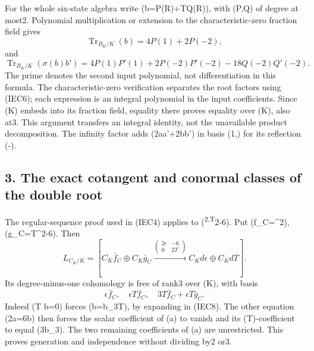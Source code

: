 \documentclass[
]{article}
\begin{document}
For the whole six-state algebra write (b=P(R)+TQ(R)), with (P,Q) of
degree at most2. Polynomial multiplication or extension to the
characteristic-zero fraction field gives \[
\operatorname{Tr}_{B_K/K}(b)=4P(1)+2P(-2),
\tag{IEC14}
\] and \[
\operatorname{Tr}_{B_K/K}(\sigma(b)b')
=4P(1)P'(1)+2P(-2)P'(-2)-18Q(-2)Q'(-2).
\tag{IEC15}
\] The prime denotes the second input polynomial, not differentiation in
this formula. The characteristic-zero verification separates the root
factors using (IEC6); each expression is an integral polynomial in the
input coefficients. Since (K) embeds into its fraction field, equality
there proves equality over (K), also at3. This argument transfers an
integral identity, not the unavailable product decomposition. The
infinity factor adds (2aa'+2bb') in basis (1,\Theta) for its reflection
(\Theta\mapsto-\Theta).

\subsection{3. The exact cotangent and conormal classes of the double
root}\label{the-exact-cotangent-and-conormal-classes-of-the-double-root}

The regular-sequence proof used in (IEC4) applies to
(\epsilon\textsuperscript{2,T}2-6\epsilon). Put (f\_C=\epsilon\^{}2),
(g\_C=T\^{}2-6\epsilon). Then \[
L_{C_K/K}=\left[C_K\bar f_C\oplus C_K\bar g_C
\xrightarrow{\left(\begin{smallmatrix}2\epsilon&-6\\0&2T\end{smallmatrix}\right)}
C_Kd\epsilon\oplus C_KdT\right].
\tag{IEC16}
\] Its degree-minus-one cohomology is free of rank3 over (K), with basis
\[
\epsilon\bar f_C,\quad \epsilon T\bar f_C,\quad
3T\bar f_C+\epsilon T\bar g_C.
\tag{IEC17}
\] Indeed (T b=0) forces (b=b\_3\epsilon T), by expanding in (IEC8). The
other equation (2\epsilon a=6b) then forces the scalar coefficient of
(a) to vanish and its (T)-coefficient to equal (3b\_3). The two
remaining coefficients of (a) are unrestricted. This proves generation
and independence without dividing by2 or3.
\end{document}
